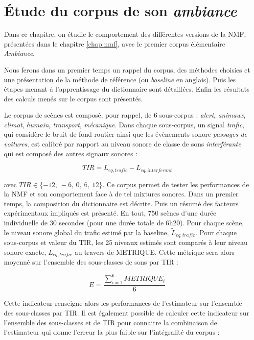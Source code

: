 
\chapter{\'Etude du corpus de son \textit{ambiance}}
\label{chap:ambiance}
Dans ce chapitre, on étudie le comportement des différentes versions de la NMF, présentées dans le chapitre \ref{chap:nmf},  avec le premier corpus élémentaire \textit{Ambiance}. 

Nous ferons dans un premier temps un rappel du corpus, des méthodes choisies et une présentation de la méthode de référence (ou \textit{baseline} en anglais). Puis les étapes menant à l'apprentissage du dictionnaire sont détaillées. Enfin les résultats des calculs menés sur le corpus sont présentés.

Le corpus de scènes est composé, pour rappel, de 6 sous-corpus : \textit{alert}, \textit{animaux}, \textit{climat}, \textit{humain}, \textit{transport}, \textit{mécanique}. Dans chaque sous-corpus, un signal \textit{trafic}, qui considère le bruit de fond routier ainsi que les évènements sonore \textit{passages de voitures}, est calibré par rapport au niveau sonore de classe de sons \textit{interférante} qui est composé des autres signaux sonores : 

\begin{equation}
TIR = L_{eq,trafic} - L_{eq,interferant}
\end{equation}

avec $TIR \in \lbrace -12,~-6,~0,~6,~12 \rbrace$. Ce corpus permet de tester les performances de la NMF et son comportement face à de tel mixtures sonores. Dans un premier temps, la composition du dictionnaire est décrite. Puis un résumé des facteurs expérimentaux impliqués est présenté.
En tout, 750 scènes d'une durée individuelle de 30 secondes (pour une durée totale de 6h20).
Pour chaque scène, le niveau sonore global du trafic estimé par la baseline, $\tilde{L}_{eq,trafic}$. Pour chaque sous-corpus et valeur du TIR, les 25 niveaux estimés sont comparés à leur niveau sonore exacte, $L_{eq,trafic}$ au travers de METRIQUE.
Cette métrique sera alors moyenné sur l'ensemble des sous-classes de sons par TIR : 

\begin{equation}
E = \frac{\sum_{i = 1}^6 METRIQUE_{i}}{6}
\end{equation}

Cette indicateur renseigne alors les performances de l'estimateur sur l'ensemble des sous-classes par TIR. Il est également possible de calculer cette indicateur sur l'ensemble des sous-classes et de TIR pour connaitre la combinaison de l'estimateur qui donne l'erreur la plus faible sur l'intégralité du corpus : 


